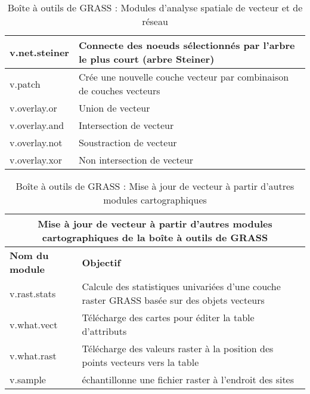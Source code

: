 \begin{table}[H]
\begin{tabular}{|p{4cm}|p{10cm}|}
  \hline v.net.steiner & Connecte des noeuds sélectionnés par l'arbre le plus court (arbre Steiner) \\
  \hline v.patch & Crée une nouvelle couche vecteur par combinaison de couches vecteurs\\
  \hline v.overlay.or & Union de vecteur\\
  \hline v.overlay.and & Intersection de vecteur\\
  \hline v.overlay.not & Soustraction de vecteur \\
  \hline v.overlay.xor & Non intersection de vecteur\\
\hline
\end{tabular}
\caption{Boîte à outils de GRASS : Modules d'analyse spatiale de vecteur et de réseau}
\end{table}

\vspace{-0.5cm}

\begin{table}[H]
\centering
 \begin{tabular}{|p{4cm}|p{10cm}|}
  \hline \multicolumn{2}{|c|}{\textbf{Mise à jour de vecteur à partir d'autres modules cartographiques de la boîte à outils de GRASS}} \\
  \hline \textbf{Nom du module} & \textbf{Objectif} \\
  \hline v.rast.stats & Calcule des statistiques univariées d'une couche raster GRASS basée sur des objets vecteurs\\
  \hline v.what.vect & Télécharge des cartes pour éditer la table d'attributs\\
  \hline v.what.rast & Télécharge des valeurs raster à la position des points vecteurs vers la table\\
  \hline v.sample & échantillonne une fichier raster à l'endroit des sites\\
\hline
\end{tabular}
\caption{Boîte à outils de GRASS : Mise à jour de vecteur à partir d'autres modules cartographiques}
\end{table}

